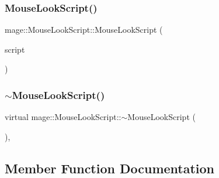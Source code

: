 \hypertarget{classmage_1_1_mouse_look_script_ab922490b99932e26d27e256a71db9905}{}\label{classmage_1_1_mouse_look_script_ab922490b99932e26d27e256a71db9905} 
\subsubsection{\texorpdfstring{Mouse\+Look\+Script()}{MouseLookScript()}\hspace{0.1cm}{\footnotesize\ttfamily [3/3]}}
{\footnotesize\ttfamily mage\+::\+Mouse\+Look\+Script\+::\+Mouse\+Look\+Script (\begin{DoxyParamCaption}\item[{\hyperlink{classmage_1_1_mouse_look_script}{Mouse\+Look\+Script} \&\&}]{script }\end{DoxyParamCaption})\hspace{0.3cm}{\ttfamily [default]}}

\hypertarget{classmage_1_1_mouse_look_script_afe4592321c71e9e64a9f355b1f9cd938}{}\label{classmage_1_1_mouse_look_script_afe4592321c71e9e64a9f355b1f9cd938} 
\subsubsection{\texorpdfstring{$\sim$\+Mouse\+Look\+Script()}{~MouseLookScript()}}
{\footnotesize\ttfamily virtual mage\+::\+Mouse\+Look\+Script\+::$\sim$\+Mouse\+Look\+Script (\begin{DoxyParamCaption}{ }\end{DoxyParamCaption})\hspace{0.3cm}{\ttfamily [virtual]}, {\ttfamily [default]}}



\subsection{Member Function Documentation}
\hypertarget{classmage_1_1_mouse_look_script_a644a7b52eccd338aaa141e8a1016c4e2}{}\label{classmage_1_1_mouse_look_script_a644a7b52eccd338aaa141e8a1016c4e2} 

